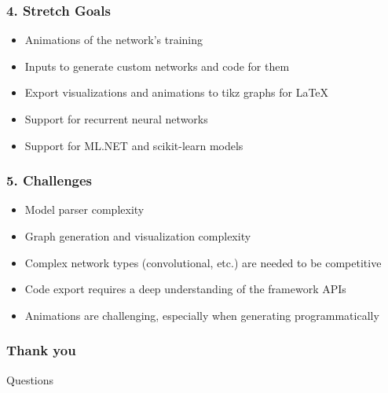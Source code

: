 \documentclass{beamer}
\begin{document}
\begin{frame}
    \frametitle{4. Stretch Goals} 
    \begin{itemize}
        \item Animations of the network's training
        \item Inputs to generate custom networks and code for them
        \item Export visualizations and animations to tikz graphs for \LaTeX 
        \item Support for recurrent neural networks
        \item Support for ML.NET and scikit-learn models
    \end{itemize}
\end{frame}

\begin{frame}
    \frametitle{5. Challenges}
    \begin{itemize}
        \item Model parser complexity
        \item Graph generation and visualization complexity
        \item Complex network types (convolutional, etc.) are needed to be competitive
        \item Code export requires a deep understanding of the framework APIs
        \item Animations are challenging, especially when generating programmatically
    \end{itemize}
\end{frame}

\begin{frame}
    \frametitle{Thank you}
    Questions
    \centering
\end{frame}
\end{document}
